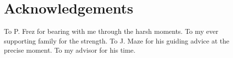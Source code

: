 \newpage
\vspace*{\fill}

\section*{Acknowledgements}

To P. Frez for bearing with me through the harsh moments. To my ever supporting family for the strength. To J. Maze for his guiding advice at the precise moment. To my advisor for his time.

\vspace*{\fill}